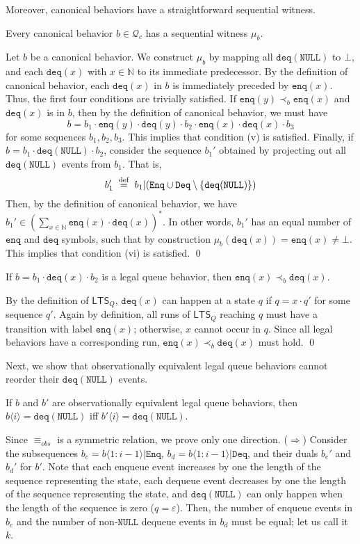 \documentclass{LMCS}
\newcommand{\defeq}{\;\stackrel{\rm def}{=}\;}
\newcommand{\NULL}{\ensuremath{\mathtt{NULL}}}
\newcommand{\enq}{\ensuremath{\mathtt{enq}}}
\newcommand{\deq}{\ensuremath{\mathtt{deq}}}
\newcommand{\ltsq}{\ensuremath{{\mathsf{LTS}}_Q}}
\newcommand{\seqx}[2]{\ensuremath{#1\langle #2\rangle}}
\newcommand{\enqset}{\ensuremath{\mathtt{Enq}}}
\newcommand{\deqset}{\ensuremath{\mathtt{Deq}}}
\newcommand{\qbehavset}{\ensuremath{\mathcal{Q}}}
\newcommand{\qbehavsetx}[1]{\ensuremath{\qbehavset_{#1}}}
\newcommand{\obsequiv}{\ensuremath{\equiv_{\mathit{obs}}}}
\newcommand\mylabel[1]{\label{#1}}
\begin{document}
\noindent Moreover, canonical behaviors have a straightforward sequential witness.

\begin{lem}\mylabel{lem:canonical-seqwit}
Every canonical behavior $b\in\qbehavsetx c$ has a sequential witness $\mu_{b}$.
\end{lem}
\proof
Let $b$ be a canonical behavior.
We construct $\mu_b$ by mapping all $\deq(\NULL)$ to $\bot$, and each $\deq(x)$ with $x\in\mathbb{N}$ to its immediate predecessor.
By the definition of canonical behavior, each $\deq(x)$ in $b$ is immediately preceded by $\enq(x)$.
Thus, the first four conditions are trivially satisfied.
If $\enq(y)\prec_b \enq(x)$ and $\deq(x)$ is in $b$, then by the definition of canonical behavior, we must have
\[
b=b_1\cdot \enq(y)\cdot \deq(y)\cdot b_2\cdot \enq(x)\cdot \deq(x)\cdot b_3
\]
for some sequences $b_1,b_2,b_3$.
This implies that condition (v) is satisfied.
Finally, if $b=b_1\cdot \deq(\NULL)\cdot b_2$, consider the sequence $b_1'$ obtained by projecting out all $\deq(\NULL)$ events from $b_1$.
That is, 
\[
b_1' \defeq b_1|(\enqset \cup \deqset\setminus\{\deq(\NULL)\})
\]
Then, by the definition of canonical behavior, we have
$
b_1'\in \left(\textstyle\sum_{x\in\mathbb{N}}\enq(x)\cdot\deq(x)\right)^*
$.
In other words, $b_1'$ has an equal number of $\enq$ and $\deq$ symbols, such that by construction $\mu_b(\deq(x))=\enq(x)\neq\bot$.
This implies that condition (vi) is satisfied.
\qed



\begin{lem}\mylabel{lem:deq-after-enq}
If $b=b_1\cdot \deq(x)\cdot b_2$  is a legal queue behavior, then $\enq(x)\prec_b\deq(x)$.
\end{lem}
\proof
By the definition of {\ltsq}, $\deq(x)$ can happen at a state $q$ if $q=x\cdot q'$ for some sequence $q'$.
Again by definition, all runs of {\ltsq} reaching $q$ must have a transition with label $\enq(x)$; otherwise, $x$ cannot occur in $q$.
Since all legal behaviors have a corresponding run, $\enq(x)\prec_b\deq(x)$ must hold.
\qed

Next, we show that observationally equivalent legal queue behaviors cannot reorder their $\deq(\NULL)$ events.

\begin{lem}\mylabel{lem:obsequiv-deqnull}
If $b$ and $b'$ are observationally equivalent legal queue behaviors, then $\seqx b i=\deq(\NULL)$ iff $\seqx {b'} i=\deq(\NULL)$.
\end{lem}
\proof
Since $\obsequiv$ is a symmetric relation, we prove only one direction.
($\Rightarrow$)
Consider the subsequences $b_e=\seqx b {1:i-1} | \enqset$, $b_d=\seqx b {1:i-1} | \deqset$, and their duals $b_e'$ and $b_d'$ for $b'$.
Note that each enqueue event increases by one the length of the sequence representing the state, each dequeue event decreases by one the length of the sequence representing the state, and $\deq(\NULL)$ can only happen when the length of the sequence is zero ($q=\varepsilon$).
Then, the number of enqueue events in $b_e$ and the number of non-{\NULL} dequeue events in $b_d$ must be equal; let us call it $k$.
\end{document}
